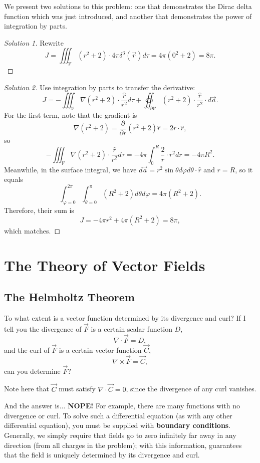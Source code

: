 We present two solutions to this problem: one that demonstrates the Dirac delta function which was just introduced, and another that demonstrates the power of integration by parts.

\begin{proof}[Solution 1]
Rewrite
\[J=\iiint_{\mathcal{V}}(r^2+2)\cdot 4\pi\delta^3(\vec{r})d\tau = 4\pi(0^2+2)=\boxed{8\pi}.\]
\end{proof}

\begin{proof}[Solution 2]
Use integration by parts to transfer the derivative:
\[J=-\iiint_{\mathcal{V}}\nabla(r^2+2)\cdot\frac{\hat{r}}{r^2}d\tau+\oiint_{\partial\mathcal{V}}(r^2+2)\cdot\frac{\hat{r}}{r^2}\cdot d\vec{a}.\]
For the first term, note that the gradient is 
\[\nabla(r^2+2)=\frac{\partial}{\partial r}(r^2+2)\hat{r}=2r\cdot\hat{r},\]
so
\[-\iiint_{\mathcal{V}}\nabla(r^2+2)\cdot\frac{\hat{r}}{r^2}d\tau=-4\pi\int_0^R\frac{2}{r}\cdot r^2dr=-4\pi R^2.\]
Meanwhile, in the surface integral, we have $d\vec{a}=r^2\sin\theta d\varphi d\theta\cdot \hat{r}$ and $r=R$, so it equals
\[\int_{\varphi=0}^{2\pi}\int_{\theta=0}^\pi (R^2+2)d\theta d\varphi=4\pi(R^2+2).\]
Therefore, their sum is
\[J=-4\pi r^2+4\pi(R^2+2)=\boxed{8\pi},\]
which matches.
\end{proof}

\section{The Theory of Vector Fields}

\subsection{The Helmholtz Theorem}

To what extent is a vector function determined by its divergence and curl? If I tell you the divergence of $\vec{F}$ is a certain scalar function $D$,
\[\nabla\cdot\vec{F}=D,\]
and the curl of $\vec{F}$ is a certain vector function $\vec{C}$,
\[\nabla\times\vec{F}=\vec{C},\]
can you determine $\vec{F}$? 

\begin{remark}
Note here that $\vec{C}$ must satisfy $\nabla\cdot\vec{C}=0$, since the divergence of any curl vanishes.
\end{remark}

And the answer is... \textbf{NOPE!} For example, there are many functions with no divergence or curl. To solve such a differential equation (as with any other differential equation), you must be supplied with \textbf{boundary conditions}.  Generally, we simply require that fields go to zero infinitely far away in any direction (from all charges in the problem); with this information,  guarantees that the field is uniquely determined by its divergence and curl.


